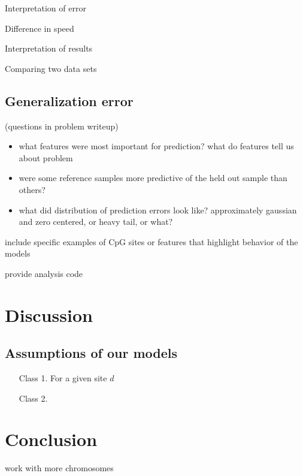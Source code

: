 \documentclass{article} %
\begin{document}
Interpretation of error

Difference in speed

Interpretation of results

Comparing two data sets

\subsection{Generalization error}



(questions in problem writeup)
\begin{itemize}
\item what features were most important for prediction? what do features tell us about problem
\item were some reference samples more predictive of the held out sample than others?
\item what did distribution of prediction errors look like? approximately gaussian and zero centered, or heavy tail, or what?
\end{itemize}


include specific examples of CpG sites or features that highlight behavior of the models

provide analysis code


\section{Discussion}

\subsection{Assumptions of our models}
\begin{enumerate}
\item [Class 1.] For a given site $d$ 
\item [Class 2.]
\end{enumerate}

\section{Conclusion}
work with more chromosomes



\end{document}

